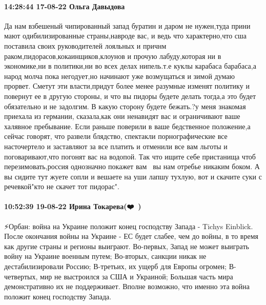  
 
 
 
 

\paragraph{14:28:44 17-08-22 Ольга Давыдова}

Да нам взбешеный чипированный запад буратин и даром не нужен,туда прини мают
одибилизированные страны,навроде вас, и ведь что характерно,что сша поставила
своих руководителей лояльных и причнм раком,пидорасов,кокаинщиков,клоунов и
прочую лабуду,которая ни в экономике,ни в политики,ни во всех делах нипель.т.е
куклы карабаса барабаса,а народ молча пока негодует,но начинают уже возмущаться
и зимой думаю прорвет. Сметут эти власти,придут более менее разумные изменят
политику и повернут ее в другую стороны, и что вы пидоры будете делать тогда,а
это будет обязательно и не задолгим. В какую сторону будете бежать.?у меня
знакомая приехала из германии, сказала,как они ненавидят вас и ограничивают
ваше халявное пребывание. Если раньше поверили в ваше бедственное положение,а
сейчас говорят, что развели блядство, спектакли порнографические все
насточертело и заставляют за все платить и отменили все вам льготы и
поговаривают,что погонят вас на водопой. Так что ищите  себе пристанища чтоб
перезимовать,россия однозначно покажет вам💪💪💪вы нам отребье никаким боком. А
вы сидите тут жуете сопли и вешаете на уши лапшу тухлую, вот и скачите суки с
речевкой"кто не скачет тот пидорас".

\paragraph{10:52:39 19-08-22 Ирина Токарева(❤️💙🤍)}

⚡️Орбан: война на Украине положит конец господству Запада - Tichys Einblick.
После окончания войны на Украине - ЕС будет слабее, чем до войны, в то время как другие страны и регионы выиграют.
Во-первых, Запад не может выиграть войну на Украине военным путем;
Во-вторых, санкции никак не дестабилизировали Россию;
В-третьих, их ущерб для Европы огромен;
В-четвертых, мир не выстроился за США и Украиной;
Большая часть мира демонстративно их не поддерживает. Вполне возможно, что именно эта война положит конец господству Запада.

